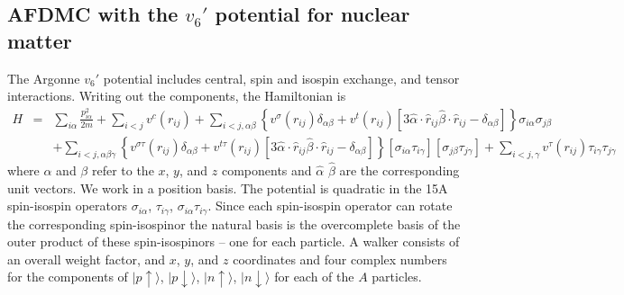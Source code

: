 \subsection{AFDMC with the $v_6'$ potential for nuclear matter}
The Argonne $v_6'$ potential includes central, spin and isospin exchange,
and tensor interactions. Writing out the components, the Hamiltonian is
\begin{eqnarray}
\label{eq.hv6}
H &=& \sum_{i\alpha} \frac{p_{i\alpha}^2}{2m}
+ \sum_{i<j} v^c(r_{ij})
+ \sum_{i<j,\alpha\beta} \left \{
v^\sigma(r_{ij})\delta_{\alpha\beta}+v^t(r_{ij})
\left [  3 \hat \alpha \cdot \hat r_{ij}
\hat \beta \cdot \hat r_{ij} -\delta_{\alpha\beta} \right] \right \}
\sigma_{i\alpha}\sigma_{j\beta}
\nonumber\\
&&
+ \sum_{i<j,\alpha\beta\gamma} \left \{
v^{\sigma\tau}(r_{ij})\delta_{\alpha\beta}+v^{t\tau}(r_{ij})
\left [  3 \hat \alpha \cdot \hat r_{ij}
\hat \beta \cdot \hat r_{ij} -\delta_{\alpha\beta} \right] \right \}
[\sigma_{i\alpha}\tau_{i\gamma}][\sigma_{j\beta}\tau_{j\gamma}]
+ \sum_{i<j,\gamma}
v^\tau(r_{ij})\tau_{i\gamma}\tau_{j\gamma}
\end{eqnarray}
where $\alpha$ and $\beta$ refer to the $x$, $y$, and $z$ components
and $\hat \alpha$ $\hat \beta$ are the corresponding unit vectors.
We work in a position basis. The potential is quadratic in
the 15A spin-isospin operators
$\sigma_{i\alpha}$, $\tau_{i\gamma}$, $\sigma_{i\alpha}\tau_{i\gamma}$.
Since each spin-isospin operator can rotate the corresponding spin-isospinor
the natural basis is the overcomplete basis of the outer product of these
spin-isospinors -- one for each particle. A walker consists of an overall
weight factor, and
$x$, $y$, and $z$ coordinates
and four
complex numbers for the components of
$|p\uparrow\rangle$, $|p\downarrow\rangle$,
$|n\uparrow\rangle$, $|n\downarrow\rangle$ for
each of the $A$ particles.

